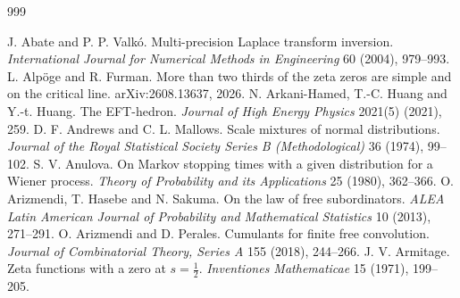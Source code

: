 \begin{thebibliography}{999}\small\setlength{\itemsep}{0pt}\setlength{\parsep}{0pt}\setlength{\parskip}{0pt}

 J. Abate and P. P. Valk\'o. Multi-precision Laplace transform inversion. \emph{International Journal for Numerical Methods in Engineering} 60 (2004), 979--993.
 L. Alp\"oge and R. Furman. More than two thirds of the zeta zeros are simple and on the critical line. arXiv:2608.13637, 2026.
 N. Arkani-Hamed, T.-C. Huang and Y.-t. Huang. The EFT-hedron. \emph{Journal of High Energy Physics} 2021(5) (2021), 259.
 D. F. Andrews and C. L. Mallows. Scale mixtures of normal distributions. \emph{Journal of the Royal Statistical Society Series B (Methodological)} 36 (1974), 99--102.
 S. V. Anulova. On Markov stopping times with a given distribution for a Wiener process. \emph{Theory of Probability and its Applications} 25 (1980), 362--366.
 O. Arizmendi, T. Hasebe and N. Sakuma. On the law of free subordinators. \emph{ALEA Latin American Journal of Probability and Mathematical Statistics} 10 (2013), 271--291.
 O. Arizmendi and D. Perales. Cumulants for finite free convolution. \emph{Journal of Combinatorial Theory, Series A} 155 (2018), 244--266.
 J. V. Armitage. Zeta functions with a zero at $s=\frac12$. \emph{Inventiones Mathematicae} 15 (1971), 199--205.

\end{thebibliography}
